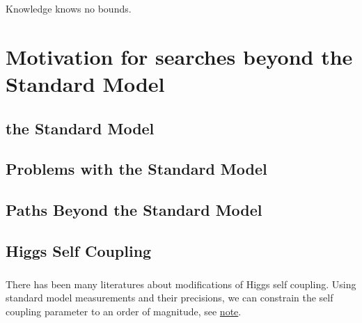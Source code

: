 \begin{savequote}[75mm]
Knowledge knows no bounds.
\end{savequote}

\chapter{Motivation for searches beyond the Standard Model}


\section{the Standard Model}
\section{Problems with the Standard Model}
\section{Paths Beyond the Standard Model}

\section{Higgs Self Coupling}
\paragraph{}
There has been many literatures about modifications of Higgs self coupling. Using standard model measurements and their precisions, we can constrain the self coupling parameter to an order of magnitude, see \href{https://arxiv.org/abs/1702.07678}{note}.